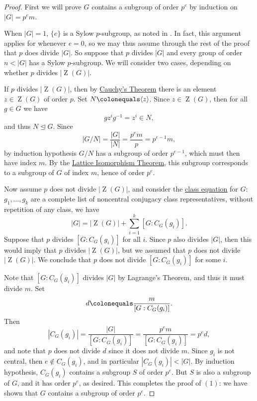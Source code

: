 \documentclass[12pt]{report}
\numberwithin{equation}{section}
\numberwithin{theorem}{chapter}
\theoremstyle{definition}
\newtheorem*{basic properties}{Basic Properties}
\newtheorem*{Important Remark}{Important Remark}
\def\norm{\mathrel{\unlhd}}
\DeclareMathOperator{\Zc}{Z}
\begin{document}
\begin{proof}
First we will prove $G$ contains a subgroup of order $p^e$ by induction on $|G| = p^em$. 

When $|G| = 1$, $\{e\}$ is a Sylow $p$-subgroup, as noted in . In fact, this argument applies for whenever $e = 0$, so we may thus assume through the rest of the proof that $p$ does divide $|G|$. 
So suppose that $p$ divides $|G|$ and every group of order $n < |G|$ has a Sylow $p$-subgroup. We will consider two cases, depending on whether $p$ divides $|\Zc(G)|$. 

If $p$ divides $|\Zc(G)|$, then by \hyperref[Cauchy's Theorem]{Cauchy's Theorem} there is an element $z \in \Zc(G)$ of order $p$. Set $N \colonequals \langle z \rangle$. Since $z \in \Zc(G)$, then for all $g \in G$ we have
$$gz^ig^{-1} = z^i \in N,$$
and thus $N \norm G$. 
Since 
$$|G/N| = \frac{|G|}{|N|} = \frac{p^em}{p} = p^{e-1}m,$$ 
by induction hypothesis $G/N$ has a subgroup of order $p^{e-1}$, which must then have index $m$. By the \hyperref[Lattice Isomorphism Theorem]{Lattice Isomorphism Theorem}, this subgroup corresponds to a subgroup of $G$ of index $m$, hence of order $p^e$.

Now assume $p$ does not divide $|\Zc(G)|$, and consider the \hyperref[Class Equation]{class equation} for $G$: $g_1, \dots, g_k$ are a complete list of noncentral conjugacy class representatives, without repetition of any class, we have
$$|G| = |\Zc(G)| + \sum_{i=1}^k [G: C_G(g_i)].$$
Suppose that $p$ divides $[G:C_G(g_i)]$ for all $i$. Since $p$ also divides $|G|$, then this would imply that $p$ divides $|\Zc(G)|$, but we assumed that $p$ does not divide $|\Zc(G)|$. We conclude that $p$ does not divide $[G:C_G(g_i)]$ for some $i$. 

Note that $[G:C_G(g_i)]$ divides $|G|$ by Lagrange's Theorem, and thus it must divide $m$. Set 
$$d \colonequals \frac{m}{[G:C_G(g_i)]}.$$ 
Then
$$|C_G(g_i)|= \frac{|G|}{[G:C_G(g_i)]} = \frac{p^em}{[G:C_G(g_i)]} = p^e d,$$ 
and note that $p$ does not divide $d$ since it does not divide $m$. Since $g_i$ is not central, then $e \notin C_G(g_i)$, and in particular $|C_G(g_i)| < |G|$. By induction hypothesis, $C_G(g_i)$ contains a subgroup $S$ of order $p^e$. But $S$ is also a subgroup of $G$, and it has order $p^e$, as desired.
This completes the proof of $(1)$: we have shown that $G$ contains a subgroup of order $p^e$.


\vspace{1em}



\end{proof}
\end{document}

